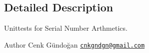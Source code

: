 \subsection{Detailed Description}
Unittests for Serial Number Arthmetics. 

\begin{DoxyAuthor}{Author}
Cenk Gündoğan \href{mailto:cnkgndgn@gmail.com}{\tt cnkgndgn@gmail.\+com} 
\end{DoxyAuthor}
